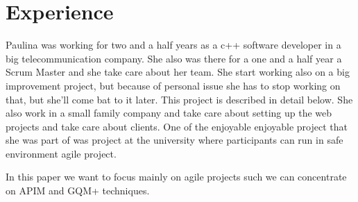 \section{Experience}

Paulina was working for two and a half years as a c++ software developer in a big telecommunication company. She also was there for a one and a half year a Scrum Master and she take care about her team. She start working also on a big improvement project, but because of personal issue she has to stop working on that, but she'll come bat to it later. This project is described in detail below. She also work in a small family company and take care about setting up the web projects and take care about clients. One of the enjoyable enjoyable project that she was part of was project at the university where participants can run in safe environment agile project. 

In this paper we want to focus mainly on agile projects such we can concentrate on APIM and GQM+ techniques.